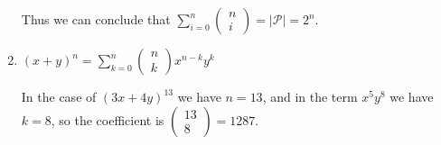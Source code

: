 \documentclass[12pt]{article}
\begin{document}
\begin{enumerate}[a]
	Thus we can conclude that $\sum_{i = 0}^{n} \begin{pmatrix}
		n \\ i
	\end{pmatrix} = | \mathcal{P} | = 2^n$.
	\item %
	$(x + y)^n = \sum_{k = 0}^n \begin{pmatrix}
		n \\ k
	\end{pmatrix} x^{n - k} y^k$

	In the case of $(3x + 4y)^{13}$ we have $n = 13$, and in the term $x^5 y^8$ we have $k = 8$, so the coefficient is $\begin{pmatrix}
		13 \\ 8
	\end{pmatrix} = 1287$.
\end{enumerate}
\end{document}
